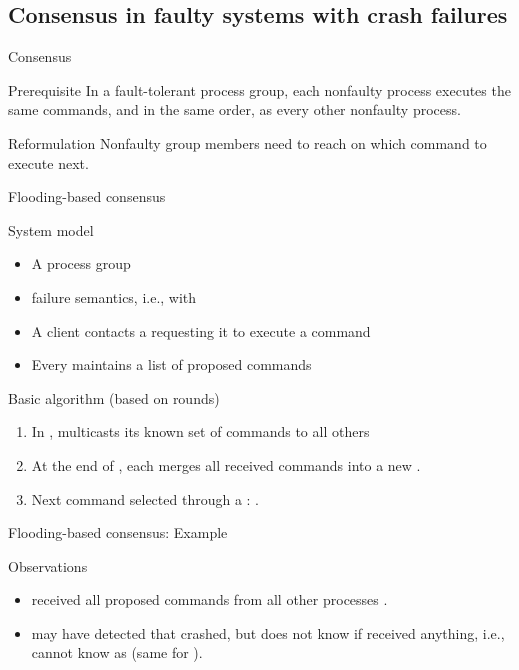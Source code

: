 \subsection{Consensus in faulty systems with crash failures}
\begin{slide}{Consensus}
  \begin{block}{Prerequisite}
    In a fault-tolerant process group, each nonfaulty process executes the same commands, and in the same
    order, as every other nonfaulty process.
  \end{block}
  \begin{alertblock}{Reformulation}
    Nonfaulty group members need to reach  on which command to execute next.
  \end{alertblock}
\end{slide}
\begin{slide}{Flooding-based consensus}
  \begin{block}{System model}
    \begin{itemize}
    \item A process group 
    \item {} failure semantics, i.e., with 
    \item A client contacts a  requesting it to execute a command
    \item Every  maintains a list of proposed commands
    \end{itemize}
  \end{block}
  \onslide
  \begin{block}{Basic algorithm (based on rounds)}
    \begin{enumerate}
    \item In  ,  multicasts its known set of commands  to
      all others
    \item At the end of , each  merges all received commands into a new
      .
    \item Next command  selected through a :
      .
    \end{enumerate}
  \end{block}
\end{slide}
\begin{slide}{Flooding-based consensus: Example}
  \centering{}
  \begin{block}{Observations}
    \begin{itemize}
    \item {} received all proposed commands from all other processes \mathexpr{\Rightarrow} 
      .
    \item {} may have detected that  crashed, but does not know if  received anything,
      i.e.,  cannot know  as  \mathexpr{\Rightarrow}
       (same for ).
    \end{itemize}
  \end{block}
\end{slide}
